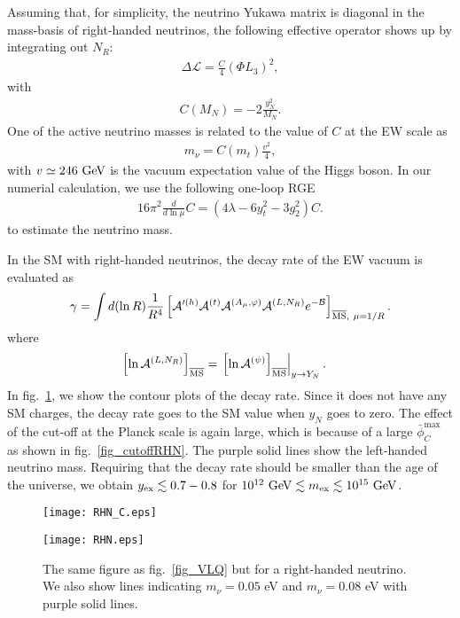 \documentclass[12pt]{article}
\begin{document}
Assuming that, for simplicity, the neutrino Yukawa matrix is diagonal
in the mass-basis of right-handed neutrinos, the following effective
operator shows up by integrating out $N_R$:
\begin{align}
 \Delta\mathcal L = \frac{C}{4}(\Phi L_3)^2,
\end{align}
with
\begin{align}
  C(M_N) = -2\frac{y_N^2}{M_N}.
\end{align}
One of the active neutrino masses is related to the value of $C$ at
the EW scale as
\begin{align}
  m_\nu = C(m_t)\frac{v^2}{4},
\end{align}
with $v\simeq 246\ {\rm GeV}$ is the vacuum expectation value of the
Higgs boson.  In our numerial calculation, we use the following
one-loop RGE \cite{Chankowski:1993tx}
\begin{align}
  16\pi^2\frac{d}{d\ln\mu}C = \left(4\lambda-6y_t^2-3g_2^2\right)C.
\end{align}
to estimate the neutrino mass.

In the SM with right-handed neutrinos, the decay rate of the EW vacuum
is evaluated as
\begin{align}
 \gamma = \int d(\ln R)\frac{1}{R^4}
 \left[
  \mathcal A'^{(h)}\mathcal A^{(t)}\mathcal A^{(A_\mu,\varphi)}
  \mathcal A^{(L,N_R)}e^{-\mathcal B}
 \right]_{\overline{\rm MS},~\mu=1/R}.
\end{align}
where
\begin{align}
 \left[
  \ln \mathcal A^{(L,N_R)}
 \right]_{\overline{\rm MS}}
  & = \left.
 \left[
  \ln \mathcal A^{(\psi)}
 \right]_{\overline{\rm MS}}
 \right|_{y\to Y_{N}}.
\end{align}
In fig.\ \ref{fig_RN}, we show the contour plots of the decay
rate. Since it does not have any SM charges, the decay rate goes to
the SM value when $y_N$ goes to zero.  The effect of the cut-off at
the Planck scale is again large, which is because of a large
$\bar\phi_C^{\max}$ as shown in fig.\ \ref{fig_cutoffRHN}.  The purple
solid lines show the left-handed neutrino mass.  Requiring that the
decay rate should be smaller than the age of the universe, we obtain
$y_{\rm ex}\lesssim0.7-0.8$ for $10^{12}~{\rm GeV}\lesssim m_{\rm
  ex}\lesssim10^{15}~{\rm GeV}$.

\begin{figure}[t]
 \begin{minipage}{0.49\linewidth}
  \begin{center}
   \texttt{[image: RHN\_C.eps]}
  \end{center}
 \end{minipage}
 \begin{minipage}{0.49\linewidth}
  \begin{center}
   \texttt{[image: RHN.eps]}
  \end{center}
 \end{minipage}
 \caption{The same figure as fig.\ \ref{fig_VLQ} but for a right-handed
  neutrino. We also show lines indicating $m_\nu=0.05$ eV and
  $m_\nu=0.08$ eV with purple solid lines.}  \label{fig_RN}
\end{figure}
\end{document}
